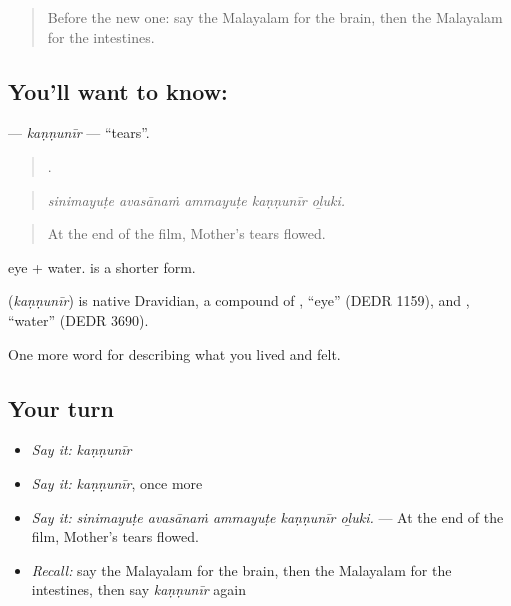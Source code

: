 \label{lesson:ML-C537-kannunir}



\begin{quote}
Before the new one: say the Malayalam for the brain, then the Malayalam for the intestines.
\end{quote}

\subsection*{You'll want to know: }
\textbf{} — \emph{kaṇṇunīr} — \textquotedblleft{}tears\textquotedblright{}.

\begin{quote}
    .
\end{quote}

\begin{quote}
\emph{sinimayuṭe avasānaṁ ammayuṭe kaṇṇunīr oḻuki.}
\end{quote}

\begin{quote}
At the end of the film, Mother's tears flowed.
\end{quote}

 eye +  water.  is a shorter form.

\begin{cousinweb}
\textbf{} (\emph{kaṇṇunīr}) is native Dravidian, a compound of , \textquotedblleft{}eye\textquotedblright{} (DEDR 1159), and , \textquotedblleft{}water\textquotedblright{} (DEDR 3690).
\end{cousinweb}

\begin{grammarlens}[title={What you've built}]
One more word for describing what you lived and felt.
\end{grammarlens}

\subsection*{Your turn}
\begin{itemize}
\raggedright
  \item \emph{Say it:} \emph{kaṇṇunīr}
  \item \emph{Say it:} \emph{kaṇṇunīr}, once more
  \item \emph{Say it:} \emph{sinimayuṭe avasānaṁ ammayuṭe kaṇṇunīr oḻuki.} — At the end of the film, Mother's tears flowed.
  \item \emph{Recall:} say the Malayalam for the brain, then the Malayalam for the intestines, then say \emph{kaṇṇunīr} again
\end{itemize}

